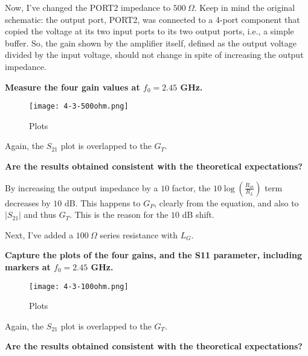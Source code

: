    \noindent Now, I've changed the PORT2 impedance to $500 \ \Omega$. Keep in mind the original schematic: the output port, PORT2, was connected to a 4-port component that copied the voltage at its two input ports to its two output ports, i.e., a simple buffer. So, the gain shown by the amplifier itself, defined as the output voltage divided by the input voltage, should not change in spite of increasing the output impedance. 


\begin{pexbox}{}
   \noindent \textbf{Measure the four gain values at $f_0 = 2.45$ GHz.}
\end{pexbox}

\begin{figure} [H] \centering
   \texttt{[image: 4-3-500ohm.png]}
   \caption{Plots}
\end{figure}

\noindent Again, the $S_{21}$ plot is overlapped to the $G_T$.

\begin{pexbox}{}
   \noindent \textbf{Are the results obtained consistent with the theoretical expectations?}
\end{pexbox}

\noindent By increasing the output impedance by a $10$ factor, the $10 \log \left( \frac{R_{in}}{R_{L}}\right)$ term decreases by $10$ dB. This happens to $G_P$, clearly from the equation, and also to $|S_{21}|$ and thus $G_T$. This is the reason for the $10$ dB shift.




\begin{pexbox}{}

   \noindent Next, I've added a $100 \ \Omega$ series resistance with $L_G$.

   \noindent \textbf{Capture the plots of the four gains, and the S11 parameter, including markers at $f_0 = 2.45$ GHz.}
\end{pexbox}


\begin{figure} [H] \centering
   \texttt{[image: 4-3-100ohm.png]}
   \caption{Plots}
\end{figure}

\noindent Again, the $S_{21}$ plot is overlapped to the $G_T$.

\begin{pexbox}{}
   \noindent \textbf{Are the results obtained consistent with the theoretical expectations?}
\end{pexbox}
   

